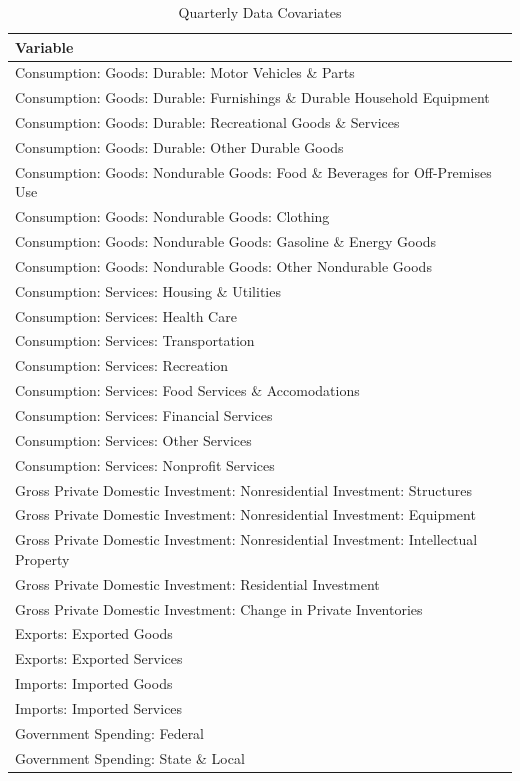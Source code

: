 \documentclass[11pt, letterpaper]{article}\usepackage[]{graphicx}\usepackage[]{color}
\begin{document}
\begin{table}[H]
\centering
\begingroup\scriptsize
\begin{tabular}{l}
  \hline
Variable \\ 
  \hline
Consumption: Goods: Durable: Motor Vehicles \& Parts \\ 
  Consumption: Goods: Durable: Furnishings \& Durable Household Equipment \\ 
  Consumption: Goods: Durable: Recreational Goods \& Services \\ 
  Consumption: Goods: Durable: Other Durable Goods \\ 
  Consumption: Goods: Nondurable Goods: Food \& Beverages for Off-Premises Use \\ 
  Consumption: Goods: Nondurable Goods: Clothing \\ 
  Consumption: Goods: Nondurable Goods: Gasoline \& Energy Goods \\ 
  Consumption: Goods: Nondurable Goods: Other Nondurable Goods \\ 
  Consumption: Services: Housing \& Utilities \\ 
  Consumption: Services: Health Care \\ 
  Consumption: Services: Transportation \\ 
  Consumption: Services: Recreation \\ 
  Consumption: Services: Food Services \& Accomodations \\ 
  Consumption: Services: Financial Services \\ 
  Consumption: Services: Other Services \\ 
  Consumption: Services: Nonprofit Services \\ 
  Gross Private Domestic Investment: Nonresidential Investment: Structures \\ 
  Gross Private Domestic Investment: Nonresidential Investment: Equipment \\ 
  Gross Private Domestic Investment: Nonresidential Investment: Intellectual Property \\ 
  Gross Private Domestic Investment: Residential Investment \\ 
  Gross Private Domestic Investment: Change in Private Inventories \\ 
  Exports: Exported Goods \\ 
  Exports: Exported Services \\ 
  Imports: Imported Goods \\ 
  Imports: Imported Services \\ 
  Government Spending: Federal \\ 
  Government Spending: State \& Local \\ 
   \hline
\end{tabular}
\endgroup
\caption{Quarterly Data Covariates} 
\end{table}
\end{document}
